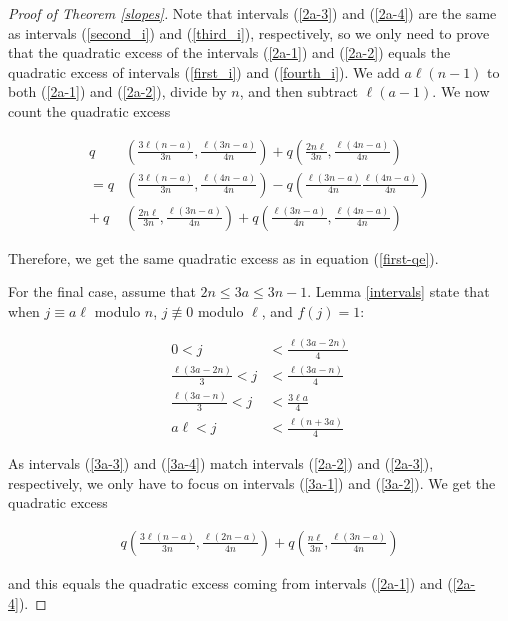 \documentclass{article}
\theoremstyle{remark}
\theoremstyle{definition}
\begin{document}
\begin{proof}[Proof of Theorem \ref{slopes}]
Note that intervals (\ref{2a-3}) and (\ref{2a-4}) are the same as intervals (\ref{second_i}) and (\ref{third_i}), respectively, so we only need to prove that the quadratic excess of the intervals (\ref{2a-1}) and (\ref{2a-2}) equals the quadratic excess of intervals (\ref{first_i}) and (\ref{fourth_i}). We add $a\ell(n-1)$ to both (\ref{2a-1}) and (\ref{2a-2}), divide by $n$, and then subtract $\ell(a-1)$. We now count the quadratic excess

\begin{align*}
   q&\left(\frac{3\ell(n-a)}{3n}, \frac{\ell(3n-a)}{4n}\right) + q\left(\frac{2n\ell}{3n}, \frac{\ell(4n-a)}{4n}\right)  \\ =  q&\left(\frac{3\ell(n-a)}{3n}, \frac{\ell(4n-a)}{4n} \right) - q\left(\frac{\ell(3n-a)}{4n} \frac{\ell(4n-a)}{4n} \right) \\ + \ q&\left(\frac{2n\ell}{3n}, \frac{\ell(3n-a)}{4n} \right) + q\left(\frac{\ell(3n-a)}{4n},\frac{\ell(4n-a)}{4n} \right)
\end{align*}

Therefore, we get the same quadratic excess as in equation (\ref{first-qe}).

For the final case, assume that $2n \leq 3a \leq 3n-1$. Lemma \ref{intervals} state that when $j \equiv a\ell$ modulo $n$, $j \not \equiv 0$ modulo $\ell$, and $f(j) = 1$:

\begin{align}
    0 < j& < \frac{\ell(3a-2n)}{4} \label{3a-1} \\
    \frac{\ell(3a-2n)}{3} < j& < \frac{\ell(3a-n)}{4} \label{3a-2} \\
    \frac{\ell(3a-n)}{3} < j & < \frac{3\ell a}{4} \label{3a-3} \\
    a\ell < j& < \frac{\ell(n+3a)}{4} \label{3a-4}
\end{align}

As intervals (\ref{3a-3}) and (\ref{3a-4}) match intervals (\ref{2a-2}) and (\ref{2a-3}), respectively, we only have to focus on intervals (\ref{3a-1}) and (\ref{3a-2}). We get the quadratic excess

\begin{align*}
    q\left(\frac{3\ell(n-a)}{3n}, \frac{\ell(2n-a)}{4n} \right) + q\left(\frac{n\ell}{3n}, \frac{\ell(3n-a)}{4n} \right)
\end{align*}

and this equals the quadratic excess coming from intervals (\ref{2a-1}) and (\ref{2a-4}).
\end{proof}
\end{document}
